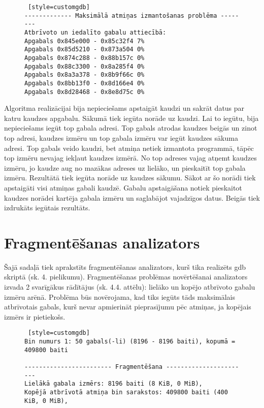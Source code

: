 \begin{figure}[h]
\begin{lstlisting} [style=customgdb]
------------- Maksimālā atmiņas izmantošanas problēma --------
Atbrīvoto un iedalīto gabalu attiecībā:
Apgabals 0x845e000 - 0x85c32f4 7%
Apgabals 0x85d5210 - 0x873a504 0%
Apgabals 0x874c288 - 0x88b157c 0%
Apgabals 0x88c3300 - 0x8a285f4 0%
Apgabals 0x8a3a378 - 0x8b9f66c 0%
Apgabals 0x8bb13f0 - 0x8d166e4 0%
Apgabals 0x8d28468 - 0x8e8d75c 0%
\end{lstlisting}
\caption{\textbf{\fontsize{11}{12}\selectfont {Maksimālā atmiņas izmantošanas rādītājs}}}
\end{figure} 

Algoritma realizācijai bija nepieciešams apstaigāt kaudzi un sakrāt datus par katru kaudzes apgabalu.
Sākumā tiek iegūta norāde uz kaudzi. 
Lai to iegūtu, bija nepieciešams iegūt top gabala adresi. 
Top gabals atrodas kaudzes beigās un zinot top adresi, kaudzes izmēru un top gabala izmēru var iegūt kaudzes sākuma adresi.
Top gabals veido kaudzi, bet atmiņa netiek izmantota programmā, tāpēc top izmēru nevajag iekļaut kaudzes izmērā.
No top adreses vajag atņemt kaudzes izmēru, jo kaudze aug no mazākas adreses uz lielāko, un pieskaitīt top gabala izmēru.
Rezultātā tiek iegūta norāde uz kaudzes sākumu.
Sākot ar šo norādi tiek apstaigāti visi atmiņas gabali kaudzē.
Gabalu apstaigāšana notiek pieskaitot kaudzes norādei kartēja gabala izmēru un saglabājot vajadzīgos datus.
Beigās tiek izdrukāts iegūtais rezultāts.



\section{Fragmentēšanas analizators}
Šajā sadaļā tiek aprakstīts fragmentēšanas analizators, kurš tika realizēts gdb skriptā (sk. 4. pielikumu).
Fragmentēšanas problēmas novērtēšanai analizators izvada 2 svarīgākus rādītājus (sk. 4.4. attēlu): lielāko un kopējo atbrīvoto gabalu izmēru arēnā.
Problēma būs novērojama, kad tiks iegūts tāds maksimālais atbrīvotais gabals, kurš nevar apmierināt pieprasījumu pēc atmiņas, ja kopējais izmērs ir pietiekošs.

\begin{figure}[h]
\begin{lstlisting} [style=customgdb]
Bin numurs 1: 50 gabals(-li) (8196 - 8196 baiti), kopumā = 409800 baiti

------------------------ Fragmentēšana -----------------------
Lielākā gabala izmērs: 8196 baiti (8 KiB, 0 MiB),
Kopējā atbrīvotā atmiņa bin sarakstos: 409800 baiti (400 KiB, 0 MiB),
\end{lstlisting}
\caption{\textbf{\fontsize{11}{12}\selectfont {Fragmentēšanas rādītāji}}}
\end{figure}


